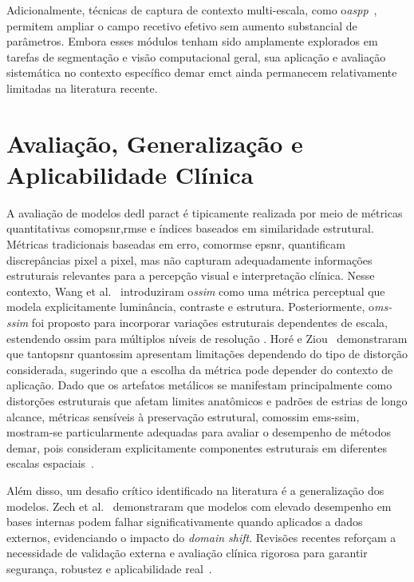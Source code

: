 Adicionalmente, técnicas de captura de contexto multi-escala, como o\textit{\acrfull{aspp}}~\cite{chenRethinkingAtrousConvolution2017}, permitem ampliar o campo recetivo efetivo sem aumento substancial de parâmetros. Embora esses módulos tenham sido amplamente explorados em tarefas de segmentação e visão computacional geral, sua aplicação e avaliação sistemática no contexto específico de\acrshort{mar} em\acrshort{ct} ainda permanecem relativamente limitadas na literatura recente.

\section{Avaliação, Generalização e Aplicabilidade Clínica}
A avaliação de modelos de\acrshort{dl} para\acrshort{ct} é tipicamente realizada por meio de métricas quantitativas como\acrshort{psnr},\acrshort{rmse} e índices baseados em similaridade estrutural. Métricas tradicionais baseadas em erro, como\acrshort{rmse} e\acrshort{psnr}, quantificam discrepâncias pixel a pixel, mas não capturam adequadamente informações estruturais relevantes para a percepção visual e interpretação clínica. Nesse contexto, Wang et al.~\cite{zhouwangImageQualityAssessment2004} introduziram o\textit{\acrfull{ssim}} como uma métrica perceptual que modela explicitamente luminância, contraste e estrutura. Posteriormente, o\textit{\acrfull{ms-ssim}} foi proposto para incorporar variações estruturais dependentes de escala, estendendo o\acrshort{ssim} para múltiplos níveis de resolução \cite{wangMultiscaleStructuralSimilarity2003a}. Hor{\'e} e Ziou~\cite{horeImageQualityMetrics2010} demonstraram que tanto\acrshort{psnr} quanto\acrshort{ssim} apresentam limitações dependendo do tipo de distorção considerada, sugerindo que a escolha da métrica pode depender do contexto de aplicação.  Dado que os artefatos metálicos se manifestam principalmente como distorções estruturais que afetam limites anatômicos e padrões de estrias de longo alcance, métricas sensíveis à preservação estrutural, como\acrshort{ssim} e\acrshort{ms-ssim}, mostram-se particularmente adequadas para avaliar o desempenho de métodos de\acrshort{mar}, pois consideram explicitamente componentes estruturais em diferentes escalas espaciais~\cite{zhouwangImageQualityAssessment2004,wangMultiscaleStructuralSimilarity2003a}.

Além disso, um desafio crítico identificado na literatura é a generalização dos modelos. Zech et al.~\cite{zechVariableGeneralizationPerformance2018} demonstraram que modelos com elevado desempenho em bases internas podem falhar significativamente quando aplicados a dados externos, evidenciando o impacto do \textit{domain shift}. Revisões recentes reforçam a necessidade de validação externa e avaliação clínica rigorosa para garantir segurança, robustez e aplicabilidade real~\cite{willeminkPreparingMedicalImaging2020,kellyKeyChallengesDelivering2019}.

